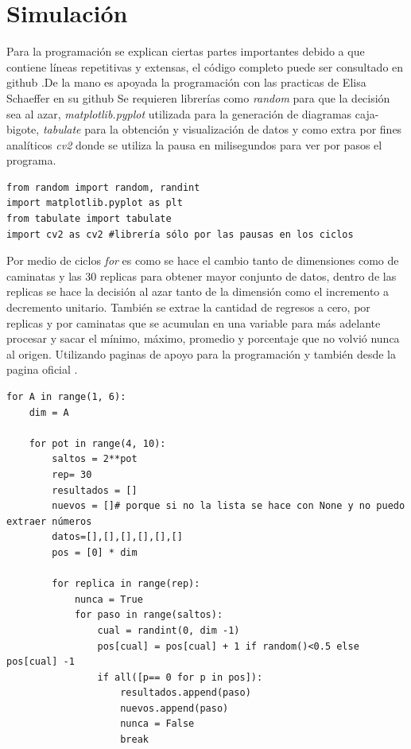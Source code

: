 \documentclass[a4paper, 11pt]{article}
\begin{document}
\section{Simulación}
Para la programación se explican ciertas partes importantes debido a que contiene l\'ineas repetitivas y extensas, el código completo puede ser consultado en github \cite{Edson}.De la mano es apoyada la programación con las practicas de Elisa Schaeffer en su github \cite{dra}
Se requieren librerías como \textit{random} para que la decisión sea al azar, \textit{matplotlib.pyplot} utilizada para la generación de diagramas caja-bigote, \textit{tabulate} para la obtención y visualización de datos y como extra por fines analíticos \textit{cv2} donde se utiliza la pausa en milisegundos para ver por pasos el programa.
\begin{verbatim}
from random import random, randint
import matplotlib.pyplot as plt
from tabulate import tabulate
import cv2 as cv2 #librería sólo por las pausas en los ciclos 
\end{verbatim}
Por medio de ciclos \textit{for} es como se hace el cambio tanto de dimensiones como de caminatas y las 30 replicas para obtener mayor conjunto de datos, dentro de las replicas se hace la decisión al azar tanto de la dimensión como el incremento a decremento unitario.
También se extrae la cantidad de regresos a cero, por replicas y por caminatas que se acumulan en una variable para m\'as adelante procesar y sacar el mínimo, máximo, promedio y porcentaje que no volvió nunca al origen. Utilizando paginas de apoyo \cite{Python2} para la programación y también desde la pagina oficial \cite{Python}.
\begin{verbatim}
for A in range(1, 6):
    dim = A
    
    for pot in range(4, 10):
        saltos = 2**pot
        rep= 30
        resultados = []
        nuevos = []# porque si no la lista se hace con None y no puedo extraer números
        datos=[],[],[],[],[],[]
        pos = [0] * dim
        
        for replica in range(rep):
            nunca = True
            for paso in range(saltos):
                cual = randint(0, dim -1)
                pos[cual] = pos[cual] + 1 if random()<0.5 else pos[cual] -1
                if all([p== 0 for p in pos]):
                    resultados.append(paso)
                    nuevos.append(paso)
                    nunca = False
                    break
\end{verbatim}
\begin{verbatim}
\end{verbatim}
\end{document}
